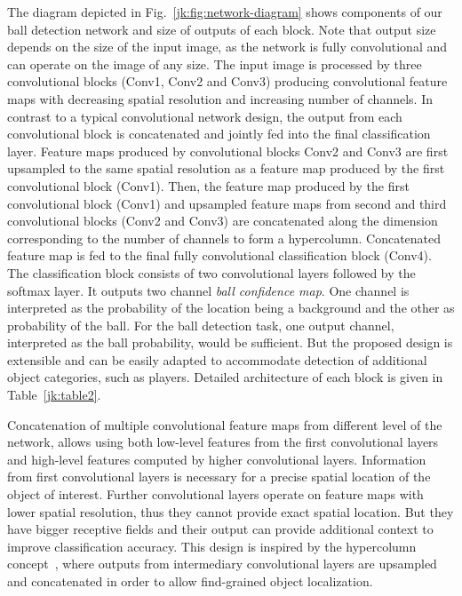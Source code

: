 \documentclass[a4paper,twoside]{article}
\begin{document}
The diagram depicted in Fig.~\ref{jk:fig:network-diagram} shows components of our ball detection network and size of outputs of each block.
Note that output size depends on the size of the input image, as the network is fully convolutional and can operate on the image of any size.
The input image is processed by three convolutional blocks (Conv1, Conv2 and Conv3) producing convolutional feature maps with decreasing spatial resolution and increasing number of channels.
In contrast to a typical convolutional network design, the output from each convolutional block is concatenated and jointly fed into the final classification layer.
Feature maps produced by convolutional blocks Conv2 and Conv3 are first upsampled to the same spatial resolution as a feature map produced by the first convolutional block (Conv1).
Then, the feature map produced by the first convolutional block (Conv1) and upsampled feature maps from second and third convolutional blocks (Conv2 and Conv3) are concatenated along the dimension corresponding to the number of channels to form a hypercolumn.
Concatenated feature map is fed to the final fully convolutional classification block (Conv4).
The classification block consists of two convolutional layers followed by the softmax layer. It outputs two channel \emph{ball confidence map}. One channel is interpreted as the probability of the location being a background and the other as probability of the ball. For the ball detection task, one output channel, interpreted as the ball probability, would be sufficient. But the proposed design is extensible and can be easily adapted to  accommodate detection of additional object categories, such as players.
Detailed architecture of each block is given in Table~\ref{jk:table2}.

Concatenation of multiple convolutional feature maps from different level of the network, allows using both low-level features from the first convolutional layers and high-level features computed by higher convolutional layers.
Information from first convolutional layers is necessary for a precise spatial location of the object of interest.
Further convolutional layers operate on feature maps with lower spatial resolution, thus they cannot provide exact spatial location. 
But they have bigger receptive fields and their output can provide additional context to improve classification accuracy.
This design is inspired by the hypercolumn concept~\cite{Hari15}, where outputs from intermediary convolutional layers are upsampled and concatenated in order to allow find-grained object localization.
\end{document}
